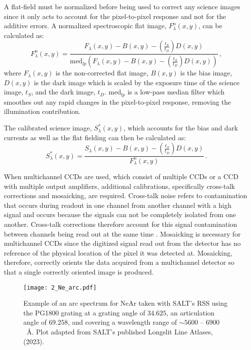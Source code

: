 A flat-field must be normalized before being used to correct any science images since it only acts to account for the pixel-to-pixel response and not for the additive errors.
A  normalized spectroscopic flat image, $F^{n}_{\lambda}(x,y)$, can be calculated as:
\begin{equation} \label{eq:norm_flat}
    F^{n}_{\lambda}(x,y) = \frac{F_{\lambda}(x,y) - B(x,y) - (\frac{t_{S}}{t_{D}})D(x,y)}{\text{med}_{lp}(F_{\lambda}(x,y) - B(x,y) - (\frac{t_{S}}{t_{D}})D(x,y))}\,,
\end{equation}
where $F_{\lambda}(x,y)$ is the non-corrected flat image, $B(x,y)$ is the bias image, $D(x,y)$ is the dark image which is scaled by the exposure time of the science image, $t_{S}$, and the dark image, $t_{D}$.
med$_{lp}$ is a low-pass median filter which smoothes out any rapid changes in the pixel-to-pixel response, removing the illumination contribution.

The calibrated science image, $S^{*}_{\lambda}(x,y)$, which accounts for the bias and dark currents as well as the flat fielding can then be calculated as:
\begin{equation} \label{eq:science_cal}
    S^{*}_{\lambda}(x,y) = \frac{S_{\lambda}(x,y) - B(x,y) - (\frac{t_{S}}{t_{D}})D(x,y)}{F^{n}_{\lambda}(x,y)}\,.
\end{equation}

When multichannel \glspl{CCD} are used, which consist of multiple \glspl{CCD} or a \gls{CCD} with multiple output amplifiers, additional calibrations, specifically cross-talk corrections and mosaicking, are required.
Cross-talk noise refers to contamination that occurs during readout in one channel from another channel with a high signal and occurs because the signals can not be completely isolated from one another.
Cross-talk corrections therefore account for this signal contamination between channels being read out at the same time \citep{CrossTalk}.
Mosaicking is necessary for multichannel \glspl{CCD} since the digitized signal read out from the detector has no reference of the physical location of the pixel it was detected at.
Mosaicking, therefore, correctly orients the data acquired from a multichannel detector so that a single correctly oriented image is produced.

\begin{figure}[t]
    \centering
    \texttt{[image: 2\_Ne\_arc.pdf]}
    \caption{
        Example of an arc spectrum for NeAr taken with \gls{SALT}'s \gls{RSS} using the PG1800 grating at a grating angle of $34.625$\degree, an articulation angle of $69.258$\degree, and covering a wavelength range of $\sim 5600$ -- $6900$~\AA.
        Plot adapted from \gls{SALT}'s published Longslit Line Atlases, (2023).\protect\footnotemark
    }
    \label{fig:Ne_arc}
\end{figure}

